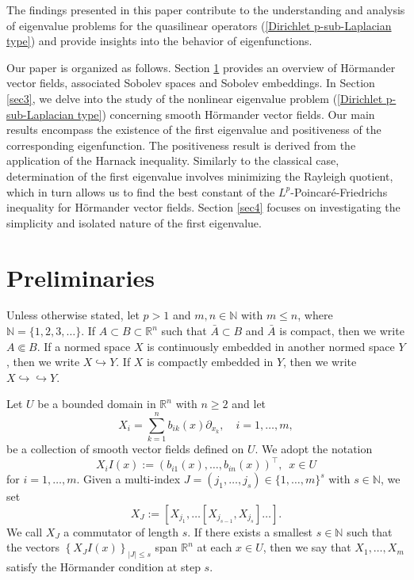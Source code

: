 \documentclass[a4paper,12pt,reqno]{amsart}
\renewcommand\eqref[1]{(\ref{#1})} %
\numberwithin{equation}{section}
\theoremstyle{plain}
\theoremstyle{definition}
\begin{document}
The findings presented in this paper contribute to the understanding and analysis of eigenvalue problems for the quasilinear operators \eqref{Dirichlet p-sub-Laplacian type} and provide insights into the behavior of eigenfunctions.  

Our paper is organized as follows. Section \ref{sec2} provides an overview of H\"ormander vector fields, associated Sobolev spaces and Sobolev embeddings. In Section \ref{sec3}, we delve into the study of the nonlinear eigenvalue problem \eqref{Dirichlet p-sub-Laplacian type} concerning smooth H\"ormander vector fields. Our main results encompass the existence of the first eigenvalue and  positiveness of the corresponding eigenfunction. The positiveness result is derived from the application of the Harnack inequality. Similarly to the classical case, determination of the first eigenvalue involves minimizing the Rayleigh quotient, which in turn allows us to find the best constant of the $L^{p}$-Poincar\'e-Friedrichs inequality for H\"ormander vector fields. Section \ref{sec4} focuses on investigating the simplicity and isolated nature of the first eigenvalue. 


\section{Preliminaries}\label{sec2}
Unless otherwise stated, let $p>1$ and $m,n\in \mathbb{N}$ with $m\leq n$, where 
$\mathbb{N}=\{1,2,3, \ldots\}$.  If $A \subset B \subset \mathbb{R}^n$ such that  $\bar{A} \subset B$ and $\bar{A}$ is compact, then we write $A \Subset B$. If a normed space $X$ is continuously embedded in another normed space $Y$, then we write $X \hookrightarrow Y$. If $X$ is compactly embedded in $Y$, then we write $X \hookrightarrow \hookrightarrow Y$.


Let $U$ be a bounded domain in $\mathbb{R}^{n}$  with $n\geq 2$ and let 
\begin{equation*}
X_{i}=\sum_{k=1}^{n} b_{ik}(x) \partial_{x_{k}}, \quad i=1,\ldots,m,
\end{equation*}
be a collection of smooth vector fields defined on $U$. We adopt the notation 
$$X_{i}I(x):=\left(b_{i1}(x),\ldots,b_{in}(x)\right)^{\top}, \enspace x\in U$$ 
for $i=1,\ldots,m$. Given a multi-index $J=\left(j_1, \ldots, j_s\right) \in\{1, \ldots, m\}^s$ with $s\in \mathbb{N}$, we set
\begin{equation*}
X_{J}:=\left[X_{j_1}, \ldots\left[X_{j_{s-1}}, X_{j_s}\right] \ldots\right].
\end{equation*}
We call $X_{J}$  a commutator  of   length  $s$. If there exists a smallest $s\in \mathbb{N}$ such that the vectors
$\left\{X_{J}I(x)\right\}_{|J| \leq s}$ span $\mathbb{R}^{n}$ at each $x\in U$, then we say that   $X_{1}, \ldots, X_{m}$ satisfy the H\"ormander condition at step $s$. 
\end{document}
